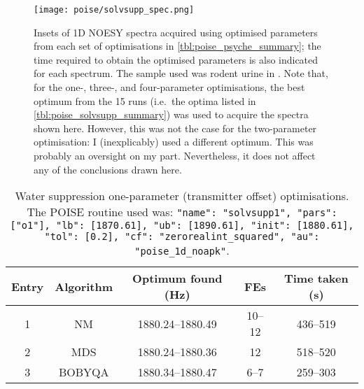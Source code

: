 \begin{figure}[!ht]
    \centering
    \texttt{[image: poise/solvsupp\_spec.png]}
    \caption[1D NOESY spectra of rodent urine sample before and after optimisation]{
        Insets of 1D NOESY spectra acquired using optimised parameters from each set of optimisations in \cref{tbl:poise_psyche_summary}; the time required to obtain the optimised parameters is also indicated for each spectrum.
        The sample used was rodent urine in .
        Note that, for the one-, three-, and four-parameter optimisations, the best optimum from the 15 runs (i.e.\ the optima listed in \cref{tbl:poise_solvsupp_summary}) was used to acquire the spectra shown here.
        However, this was not the case for the two-parameter optimisation: I (inexplicably) used a different optimum.
        This was probably an oversight on my part.
        Nevertheless, it does not affect any of the conclusions drawn here.
    }
    \label{fig:poise_solvsupp_spec}
\end{figure}

\begin{table}
    \centering
    \begin{tabular}{ccccc}
        \toprule
        Entry & Algorithm & Optimum found (\unit{\Hz}) & FEs    & Time taken (\unit{\s}) \\
        \midrule
        1     & NM        & 1880.24--1880.49         & 10--12 & 436--519             \\
        2     & MDS       & 1880.24--1880.36         & 12     & 518--520             \\
        3     & BOBYQA    & 1880.34--1880.47         & 6--7   & 259--303             \\
        \bottomrule
    \end{tabular}
    \caption[Water suppression one-parameter optimisations]{
        Water suppression one-parameter (transmitter offset) optimisations.
        The POISE routine used was: \texttt{{"name": "solvsupp1", "pars": ["o1"], "lb": [1870.61], "ub": [1890.61], "init": [1880.61], "tol": [0.2], "cf": "zerorealint_squared", "au": "poise_1d_noapk"}}.
    }
    \label{tbl:poise_solvsupp1p}
\end{table}

